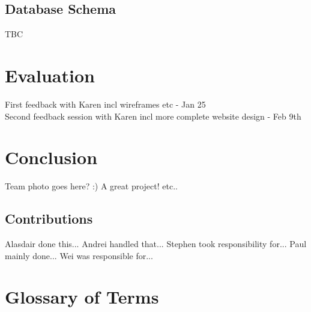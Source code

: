 \documentclass{l3proj}
\begin{document}
\section{Database Schema}
TBC

\chapter{Evaluation}

First feedback with Karen incl wireframes etc - Jan 25\\
Second feedback session with Karen incl more complete website design - Feb 9th

\chapter{Conclusion}

Team photo goes here? :)
A great project! etc..

\section{Contributions}

Alasdair done this...
Andrei handled that...
Stephen took responsibility for... 
Paul mainly done...
Wei was responsible for...	





\appendix
\chapter{Glossary of Terms}
\label{sec:gloss}
\end{document}
